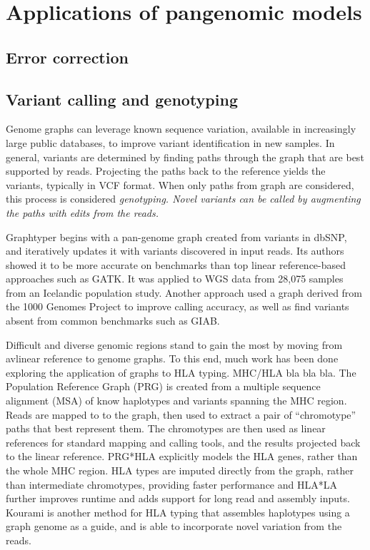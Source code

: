 \section{Applications of pangenomic models}

\subsection{Error correction}

\subsection{Variant calling and genotyping}

Genome graphs can leverage known sequence variation, available in increasingly large public databases, to improve variant identification in new samples.
In general, variants are determined by finding paths through the graph that are best supported by reads.
Projecting the paths back to the reference yields the variants, typically in VCF format.
When only paths from graph are considered, this process is considered \it{genotyping}.
Novel variants can be \it{called} by augmenting the paths with edits from the reads.

Graphtyper \cite{eggertsson2017graphtyper} begins with a pan-genome graph created from variants in dbSNP, and iteratively updates it with variants discovered in input reads.
Its authors showed it to be more accurate on benchmarks than top linear reference-based approaches such as GATK.
It was applied to WGS data from 28,075 samples from an Icelandic population study.
Another approach used a graph derived from the 1000 Genomes Project \cite{Rakocevic_2019} to improve calling accuracy, as well as find variants absent from common benchmarks such as GIAB.

Difficult and diverse genomic regions stand to gain the most by moving from avlinear reference to genome graphs.
To this end, much work has been done exploring the application of graphs to HLA typing.
MHC/HLA bla bla bla.
The Population Reference Graph (PRG) \cite{dilthey2015improved} is created from a multiple sequence alignment (MSA) of know haplotypes and variants spanning the MHC region.
Reads are mapped to to the graph, then used to extract a pair of ``chromotype'' paths that best represent them.
The chromotypes are then used as linear references for standard mapping and calling tools, and the results projected back to the linear reference.
PRG*HLA \cite{dilthey2018hla} explicitly models the HLA genes, rather than the whole MHC region.
HLA types are imputed directly from the graph, rather than intermediate chromotypes, providing faster performance and  HLA*LA \cite{dilthey2019hla} further improves runtime and adds support for long read and assembly inputs.
Kourami \cite{lee2018kourami} is another method for HLA typing that assembles haplotypes using a graph genome as a guide, and is able to incorporate novel variation from the reads. 

